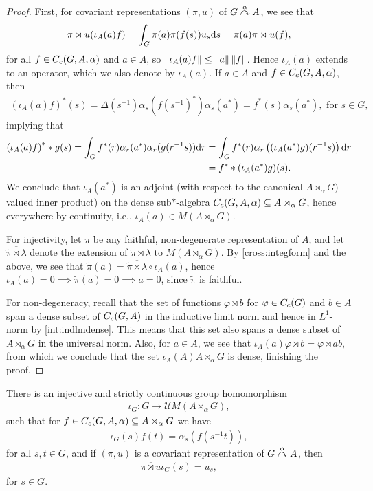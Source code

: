 \begin{proof}
First, for covariant representations $(\pi,u)$ of $G \stackrel{\alpha}{\curvearrowright} A$, we see that
\begin{align*}
	\pi \rtimes u(\iota_A(a) f) = \int_G \pi(a) \pi(f(s)) u_s \mathrm{d} s = \pi(a) \pi \rtimes u (f),
\end{align*}
for all $f \in C_c(G,A,\alpha)$ and $a \in A$, so $\left\lVert \iota_A(a) f \right\rVert \leq \left\lVert a \right\rVert \left\lVert f \right\rVert$. Hence $\iota_A(a)$ extends to an operator, which we also denote by $\iota_A(a)$. If $a \in A$ and $f \in C_c(G,A,\alpha)$, then 
\begin{align*}
	\left( \iota_A(a) f \right)^*(s) = \Delta(s^{-1}) \alpha_s(f(s^{-1})^*) \alpha_s(a^*) = f^*(s) \alpha_s(a^*), \text{ for }s \in G,
\end{align*}
implying that
\begin{align*}
	\left( \iota_A(a) f \right)^* \ast g (s) = \int_G f^*(r) \alpha_r(a^*) \alpha_r(g(r^{-1}s)) \mathrm{d} r &= \int_G f^*(r) \alpha_r \left(  (\iota_A(a^*) g)(r^{-1}s)\right) \mathrm{d} r \\
	&= f^* \ast(\iota_A(a^*) g)(s).
\end{align*}
We conclude that $\iota_A(a^*)$ is an adjoint (with respect to the canonical $A \rtimes_\alpha G)$-valued inner product) on the dense sub$*$-algebra $C_c(G,A,\alpha) \subseteq A \rtimes_\alpha G$, hence everywhere by continuity, i.e., $\iota_A(a) \in M(A \rtimes_\alpha G)$. 

For injectivity, let $\pi$ be any faithful, non-degenerate representation of $A$, and let $\overline{\tilde \pi \rtimes \lambda}$ denote the extension of $\tilde \pi \rtimes \lambda$ to $M(A \rtimes_\alpha G)$. By \ref{cross:integform} and the above, we see that $\tilde \pi(a) = \overline{\tilde \pi \rtimes \lambda } \circ \iota_A(a)$, hence $\iota_A(a) = 0 \implies \tilde \pi(a) = 0 \implies a = 0$, since $\tilde \pi$ is faithful.

For non-degeneracy, recall that the set of functions $\varphi \rtimes b$ for $\varphi \in C_c(G)$ and $b \in A $ span a dense subset of $C_c(G,A)$ in the inductive limit norm and hence in $L^1$-norm by \cref{int:indlmdense}. This means that this set also spans a dense subset of $A \rtimes_\alpha G$ in the universal norm. Also, for $a \in A$, we see that $\iota_A(a) \varphi \rtimes b = \varphi \rtimes ab$, from which we conclude that the set $\iota_A(A) A \rtimes_\alpha G$ is dense, finishing the proof.
\end{proof}
\begin{lemma}
	There is an injective and strictly continuous group homomorphism
	\begin{align*}
		\iota_G \colon G \to \mathcal{U} M(A \rtimes_\alpha G),
	\end{align*}
	such that for $f \in C_c(G,A,\alpha) \subseteq A \rtimes_\alpha G$ we have
	\begin{align*}
		\iota_G(s) f(t) = \alpha_s (f(s^{-1}t)),
	\end{align*}
	for all $s,t \in G$, and if $(\pi,u)$ is a covariant representation of $G \stackrel{\alpha}{\curvearrowright} A$, then
	\begin{align*}
		\overline{\pi \rtimes u} \iota_G(s) =u_s,
	\end{align*}
for $s \in G$.
\end{lemma}
